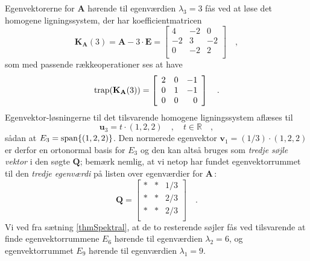\begin{example}
Egenvektorerne for $\mathbf{A}$ hørende til egenværdien $\lambda_{3} = 3$ fås ved at løse det homogene ligningssystem, der har koefficientmatricen
\begin{equation}
\mathbf{K}_{\mathbf{A}}(3) = \mathbf{A} - 3\cdot\mathbf{E} = \left[
                                          \begin{array}{rrr}
                                           4  & -2  & 0 \\
                                            -2 &  3 &  -2\\
                                            0 &  -2 & 2 \\
                                          \end{array}
                                        \right] \quad ,
\end{equation}
som med passende rækkeoperationer ses at have
\begin{equation}
\mathrm{trap}(\mathbf{K}_{\mathbf{A}}(3)) = \left[
                                          \begin{array}{rrr}
                                            2 &  0 & -1 \\
                                            0 & 1 & -1 \\
                                            0 & 0& 0 \\
                                          \end{array}
                                        \right] \quad .
\end{equation}
Egenvektor-løsningerne til det tilsvarende homogene ligningssystem aflæses til
\begin{equation}
\mathbf{u}_{3} = t\cdot(1, 2,2) \quad , \quad t \in \mathbb{R} \quad ,
 \end{equation}
 sådan at $E_{3}= \mathrm{span}\{(1,2,2)\}$. Den normerede egenvektor $\mathbf{v}_{1} = (1/3)\cdot (1, 2, 2)$ er derfor en ortonormal basis for $E_{3}$ og den kan altså bruges som {\textit{tredje søjle vektor}} i den søgte $\mathbf{Q}$; bemærk nemlig, at vi netop har fundet egenvektorrummet til den {\textit{tredje egenværdi}} på listen over egenværdier for $\mathbf{A}$\,:
\begin{equation}
\mathbf{Q}= \left[
          \begin{array}{rrr}
            * & * & 1/3 \\
            * & * & 2/3 \\
            * & * & 2/3 \\
          \end{array}
        \right] \quad .
\end{equation}
Vi ved fra sætning \ref{thmSpektral}, at de to resterende søjler fås ved tilsvarende at finde  egenvektorrummene $E_{6}$  hørende til egenværdien $\lambda_{2} = 6$, og egenvektorrummet $E_{9}$  hørende til egenværdien $\lambda_{1} = 9$.\\


\end{example}
